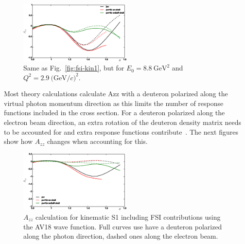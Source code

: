 \begin{figure}[htb]
\begin{center}
  \includegraphics[width=0.5\textwidth]{figs/kin2_cdbonn_av18.eps}
\caption{Same as Fig.~\ref{fig:fsi-kin1}, but for $E_0=8.8\mathrm{~GeV}^2$ and $Q^2=2.9\mathrm{~(GeV/}c)^2$.}
\label{fig:fsi-kin2}       %
\end{center}
\end{figure}


\iffalse
Most theory calculations calculate Azz with a deuteron polarized along the  virtual photon momentum direction as this limits the number of response  functions included in the cross section.  For a deuteron polarized along the  electron beam direction, an extra rotation of the deuteron density matrix needs  to be accounted for and extra response functions contribute~\cite{Cosyn:2014sqa}.  The next figures show how $A_{zz}$ changes  when accounting for this.

\begin{figure}[htb]
\begin{center}
  \includegraphics[width=0.5\textwidth]{figs/beampol_av18_kin1.eps}
\caption{$A_{zz}$ calculation for kinematic S1 including FSI contributions 
using the AV18 wave function.  
Full curves use have a deuteron polarized along the photon direction, dashed 
ones along the electron beam.}
\label{fig:beampol1}       %
\end{center}
\end{figure}

